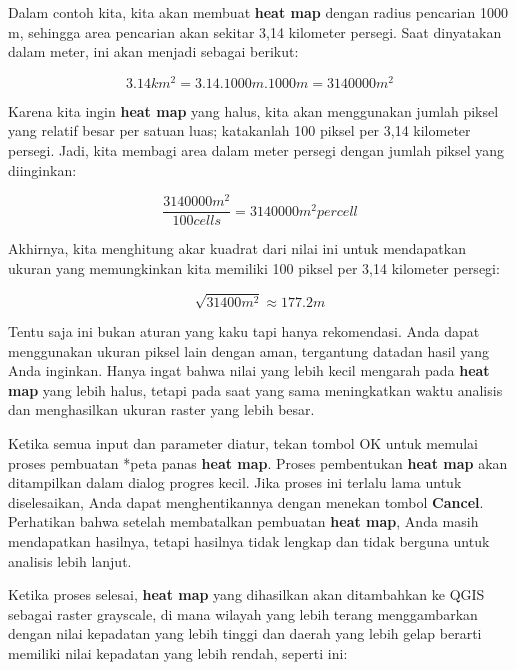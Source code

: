 \documentclass[]{book}
\begin{document}
Dalam contoh kita, kita akan membuat \textbf{heat map} dengan radius pencarian 1000 m, sehingga area pencarian akan sekitar 3,14 kilometer persegi. Saat dinyatakan dalam meter, ini akan menjadi sebagai berikut:

\begin{equation*}
3.14 km^2 = 3.14 . 1000 m . 1000 m = 3140000m^2
\end{equation*}

Karena kita ingin \textbf{heat map} yang halus, kita akan menggunakan jumlah piksel yang relatif besar per satuan luas; katakanlah 100 piksel per 3,14 kilometer persegi. Jadi, kita membagi area dalam meter persegi dengan jumlah piksel yang diinginkan:

\begin{equation*}
\frac{3140000m^2}{100 cells} = 3140000m^2 per cell
\end{equation*}

Akhirnya, kita menghitung akar kuadrat dari nilai ini untuk mendapatkan ukuran yang memungkinkan kita memiliki 100 piksel per 3,14 kilometer persegi:

\begin{equation*}
\sqrt{31400m^2} \approx 177.2 m
\end{equation*}

Tentu saja ini bukan aturan yang kaku tapi hanya rekomendasi. Anda dapat menggunakan ukuran piksel lain dengan aman, tergantung datadan hasil yang Anda inginkan. Hanya ingat bahwa nilai yang lebih kecil mengarah pada \textbf{heat map} yang lebih halus, tetapi pada saat yang sama meningkatkan waktu analisis dan menghasilkan ukuran raster yang lebih besar.

Ketika semua input dan parameter diatur, tekan tombol OK untuk memulai proses pembuatan *peta panas \textbf{heat map}. Proses pembentukan \textbf{heat map} akan ditampilkan dalam dialog progres kecil. Jika proses ini terlalu lama untuk diselesaikan, Anda dapat menghentikannya dengan menekan tombol \textbf{Cancel}. Perhatikan bahwa setelah membatalkan pembuatan \textbf{heat map}, Anda masih mendapatkan hasilnya, tetapi hasilnya tidak lengkap dan tidak berguna untuk analisis lebih lanjut.

Ketika proses selesai, \textbf{heat map} yang dihasilkan akan ditambahkan ke QGIS sebagai raster grayscale, di mana wilayah yang lebih terang menggambarkan dengan nilai kepadatan yang lebih tinggi dan daerah yang lebih gelap berarti memiliki nilai kepadatan yang lebih rendah, seperti ini:
\end{document}
